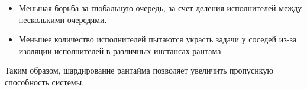\begin{itemize}
    \item Меньшая борьба за глобальную очередь, за счет деления исполнителей между несколькими очередями.
    \item Меньшее количество исполнителей пытаются украсть задачи у соседей из-за изоляции исполнителей в различных инстансах рантама.
\end{itemize}

Таким образом, шардирование рантайма позволяет увеличить пропуснкую способность системы.
